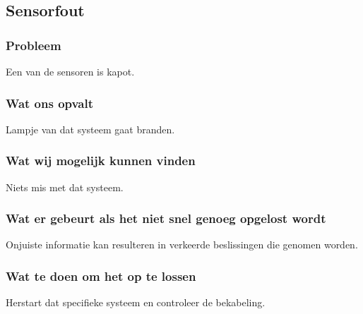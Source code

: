 \subsection{Sensorfout}

\subsubsection{Probleem}
Een van de sensoren is kapot.

\subsubsection{Wat ons opvalt}
Lampje van dat systeem gaat branden.

\subsubsection{Wat wij mogelijk kunnen vinden}
Niets mis met dat systeem.

\subsubsection{Wat er gebeurt als het niet snel genoeg opgelost wordt}
Onjuiste informatie kan resulteren in verkeerde beslissingen die genomen worden.

\subsubsection{Wat te doen om het op te lossen}
Herstart dat specifieke systeem en controleer de bekabeling.